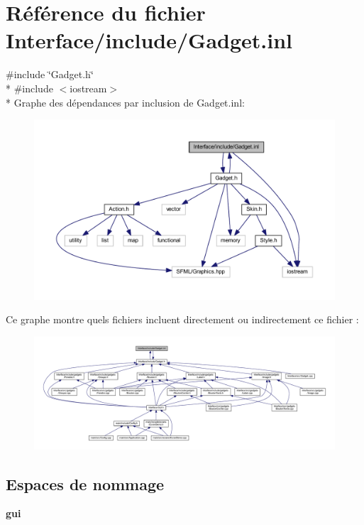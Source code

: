 \section{Référence du fichier Interface/include/\+Gadget.inl}
\label{_gadget_8inl}
{\ttfamily \#include \char`\"{}Gadget.\+h\char`\"{}}\\*
{\ttfamily \#include $<$iostream$>$}\\*
Graphe des dépendances par inclusion de Gadget.\+inl\+:\nopagebreak
\begin{figure}[H]
\begin{center}
\leavevmode
\includegraphics[width=350pt]{_gadget_8inl__incl}
\end{center}
\end{figure}
Ce graphe montre quels fichiers incluent directement ou indirectement ce fichier \+:\nopagebreak
\begin{figure}[H]
\begin{center}
\leavevmode
\includegraphics[width=350pt]{_gadget_8inl__dep__incl}
\end{center}
\end{figure}
\subsection*{Espaces de nommage}
\begin{DoxyCompactItemize}
\item 
 {\bf gui}
\end{DoxyCompactItemize}
